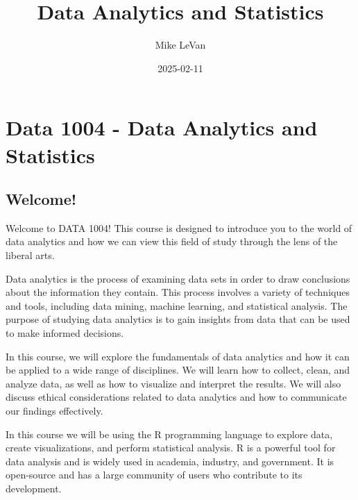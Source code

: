 \documentclass[
  letterpaper,
  DIV=11,
  numbers=noendperiod]{scrreprt}
\title{Data Analytics and Statistics}
\author{Mike LeVan}
\date{2025-02-11}
\renewcommand*\contentsname{Table of contents}
\newcommand\contentsname{Table of contents}
\begin{document}
\maketitle

\renewcommand*\contentsname{Table of contents}
{
\hypersetup{linkcolor=}
\setcounter{tocdepth}{2}
\tableofcontents
}


\chapter*{Data 1004 - Data Analytics and
Statistics}\label{data-1004---data-analytics-and-statistics}


\section*{Welcome!}\label{welcome}


Welcome to DATA 1004! This course is designed to introduce you to the
world of data analytics and how we can view this field of study through
the lens of the liberal arts.

Data analytics is the process of examining data sets in order to draw
conclusions about the information they contain. This process involves a
variety of techniques and tools, including data mining, machine
learning, and statistical analysis. The purpose of studying data
analytics is to gain insights from data that can be used to make
informed decisions.

In this course, we will explore the fundamentals of data analytics and
how it can be applied to a wide range of disciplines. We will learn how
to collect, clean, and analyze data, as well as how to visualize and
interpret the results. We will also discuss ethical considerations
related to data analytics and how to communicate our findings
effectively.

In this course we will be using the R programming language to explore
data, create visualizations, and perform statistical analysis. R is a
powerful tool for data analysis and is widely used in academia,
industry, and government. It is open-source and has a large community of
users who contribute to its development.
\end{document}
